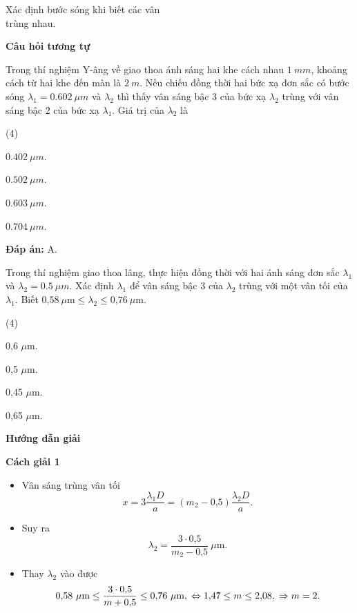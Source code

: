 \begin{dang}{Xác định bước sóng khi biết các vân\\ trùng nhau.}
{\begin{center}
	\textbf{Câu hỏi tương tự}
	\end{center}
Trong thí nghiệm Y-âng về giao thoa ánh sáng hai khe cách nhau $ \SI{1}{mm} $, khoảng cách từ hai khe đến màn là $ \SI{2}{m} $. Nếu chiếu đồng thời hai bức xạ đơn sắc có bước sóng $ \lambda_{1} = \SI{0,602}{\mu m} $  và $ \lambda_{2} $ thì thấy vân sáng bậc 3 của bức xạ $ \lambda_{2} $ trùng với vân sáng bậc $ 2 $ của bức xạ $ \lambda_{1} $. Giá trị của $ \lambda_{2} $ là
\begin{mcq}(4)
	\item $ \SI{0,402}{\mu m} $.
	\item $ \SI{0,502}{\mu m} $.
	\item $ \SI{0,603}{\mu m} $.
	\item $ \SI{0,704}{\mu m} $.
\end{mcq}
\textbf{Đáp án:} A.
}
 
{Trong thí nghiệm giao thoa lâng, thực hiện đồng thời với hai ánh sáng đơn sắc  $\lambda_1$ và $\lambda_2 = \SI{0,5}{\mu m} $. Xác định $\lambda_1$ để vân sáng bậc 3 của $\lambda_2$ trùng với một vân tối của $\lambda_1$. Biết $\text{0,58}\ \mu \text{m} \leq \lambda_2 \leq \text{0,76}\ \mu \text{m}$.
\begin{mcq}(4)
\item  0,6 $\mu$m.			
\item  0,5 $\mu$m.			
\item  0,45 $\mu$m.			
\item  0,65 $\mu$m.
\end{mcq}
}
{\begin{center}
	\textbf{Hướng dẫn giải}
\end{center}
\textbf{Cách giải 1}

\begin{itemize}
	\item Vân sáng trùng vân tối 
	\begin{equation*}
		x=3\dfrac{\lambda_1 D}{a}=(m_2 - \text{0,5})\dfrac{\lambda_2 D}{a}.
	\end{equation*}
	\item Suy ra 
	\begin{equation*}
	\lambda_2= \dfrac{3\cdot \text{0,5}}{m_2-\text{0,5}}\ \mu \text{m}. 
	\end{equation*}
	\item Thay $\lambda_2$ vào được 
	\begin{equation*}
		 \text{0,58}\ \mu \text{m} \leq \dfrac{3\cdot \text{0,5}}{m+\text{0,5}} \leq \text{0,76}\ \mu \text{m},\\
		 \Leftrightarrow \text{1,47} \leq m \leq \text{2,08}, \\
		 \Rightarrow m =2.
	\end{equation*}


\end{itemize}}
\end{dang}
